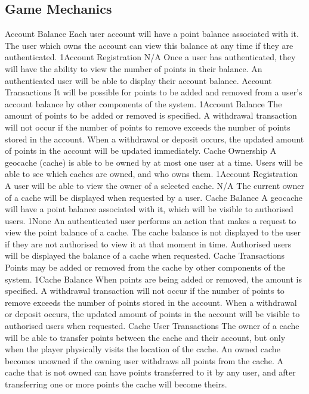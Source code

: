 	\subsection{Game Mechanics}
		\funcreq
			{Account Balance}
			{Each user account will have a point balance associated with it. The user which owns the account can view this balance at any time if they are authenticated.}
			{1}{Account Registration}
			{N/A}
			{Once a user has authenticated, they will have the ability to view the number of points in their balance.}
			{An authenticated user will be able to display their account balance.}
		\funcreq
			{Account Transactions}
			{It will be possible for points to be added and removed from a user's account balance by other components of the system.}
			{1}{Account Balance}
			{The amount of points to be added or removed is specified.}
			{A withdrawal transaction will not occur if the number of points to remove exceeds the number of points stored in the account.}
			{When a withdrawal or deposit occurs, the updated amount of points in the account will be updated immediately.}
		\funcreq
			{Cache Ownership}
			{A geocache (cache) is able to be owned by at most one user at a time. Users will be able to see which caches are owned, and who owns them.}
			{1}{Account Registration}
			{A user will be able to view the owner of a selected cache.}
			{N/A}
			{The current owner of a cache will be displayed when requested by a user.}
		\funcreq
			{Cache Balance}
			{A geocache will have a point balance associated with it, which will be visible to authorised users.}
			{1}{None}
			{An authenticated user performs an action that makes a request to view the point balance of a cache.}
			{The cache balance is not displayed to the user if they are not authorised to view it at that moment in time.}
			{Authorised users will be displayed the balance of a cache when requested.}
		\funcreq
			{Cache Transactions}
			{Points may be added or removed from the cache by other components of the system.}
			{1}{Cache Balance}
			{When points are being added or removed, the amount is specified.}
			{A withdrawal transaction will not occur if the number of points to remove exceeds the number of points stored in the account.}
			{When a withdrawal or deposit occurs, the updated amount of points in the account will be visible to authorised users when requested.}
		\funcreq
			{Cache User Transactions}
			{The owner of a cache will be able to transfer points between the cache and their account, but only when the player physically visits the location of the cache. An owned cache becomes unowned if the owning user withdraws all points from the cache. A cache that is not owned can have points transferred to it by any user, and after transferring one or more points the cache will become theirs.}
